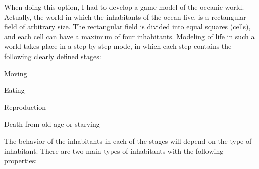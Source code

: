 When doing this option, I had to develop a game model of the oceanic world. Actually, the world in which the inhabitants of the ocean live, is a rectangular field of arbitrary size. The rectangular field is divided into equal squares (cells), and each cell can have a maximum of four inhabitants. Modeling of life in such a world takes place in a step-\/by-\/step mode, in which each step contains the following clearly defined stages\+:


\begin{DoxyItemize}
\item Moving
\item Eating
\item Reproduction
\item Death from old age or starving
\end{DoxyItemize}

 The behavior of the inhabitants in each of the stages will depend on the type of inhabitant. There are two main types of inhabitants with the following properties\+:


